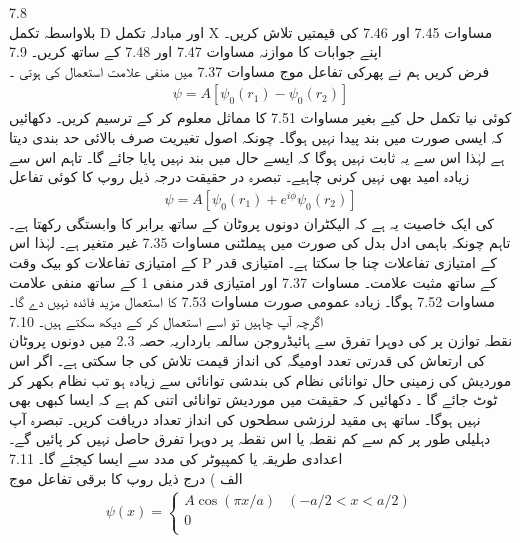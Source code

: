  
7.8\\
بلاواسطہ تکمل D اور مبادلہ تکمل X مساوات 7.45 اور 7.46 کی قیمتیں تلاش کریں۔ اپنے جوابات کا موازنہ مساوات 7.47 اور 7.48 کے ساتھ کریں۔ 
7.9\\
فرض کریں ہم نے پھرکی تفاعل موج مساوات 7.37 میں منفی علامت استعمال کی ہوتی ۔
\begin{align}
\psi=A[\psi_{0}(r_{1})-\psi_{0}(r_{2})]
\end{align}
 کوئی نیا تکمل حل کیے بغیر مساوات 7.51 کا مماثل  معلوم کر کے ترسیم کریں۔ دکھائیں کہ ایسی صورت میں بند پیدا نہیں ہوگا۔ چونکہ اصول تغیریت صرف بالائی حد بندی دیتا ہے لہٰذا اس سے یہ ثابت نہیں ہوگا کہ ایسے حال میں بند نہیں پایا جائے گا۔ تاہم اس سے زیادہ امید بھی نہیں کرنی چاہیے۔ تبصرہ در حقیقت درجہ ذیل روپ کا کوئی تفاعل 
\begin{align}
\psi=A[\psi_{0}(r_{1})+e^{i\phi}\psi_{0}(r_{2})]
\end{align}
 کی ایک خاصیت یہ ہے کہ الیکٹران دونوں پروٹان کے ساتھ برابر کا وابستگی رکھتا ہے۔ تاہم چونکہ باہمی ادل بدل   کی صورت میں ہیملٹنی مساوات 7.35 غیر متغیر ہے۔ لہٰذا اس کے امتیازی تفاعلات کو بیک وقت P کے امتیازی تفاعلات چنا جا سکتا ہے۔ امتیازی قدر  کے ساتھ مثبت علامت۔ مساوات 7.37 اور امتیازی قدر منفی 1 کے ساتھ منفی علامت مساوات 7.52 ہوگا۔ زیادہ عمومی صورت مساوات 7.53 کا استعمال مزید فائدہ نہیں دے گا۔ اگرچہ آپ چاہیں تو اسے استعمال کر کے دیکھ سکتے ہیں۔
7.10\\
نقطہ توازن پر   کی دوہرا تفرق سے ہائیڈروجن سالمہ بارداریہ حصہ 2.3 میں دونوں پروٹان کی ارتعاش کی قدرتی تعدد اومیگہ کی انداز قیمت تلاش کی جا سکتی ہے۔ اگر اس موردیش کی زمینی حال توانائی     نظام کی بندشی توانائی سے زیادہ ہو تب نظام بکھر کر ٹوٹ جائے گا ۔ دکھائیں کہ حقیقت میں موردیش توانائی اتنی کم ہے کہ ایسا کبھی بھی نہیں ہوگا۔ ساتھ ہی مقید لرزشی سطحوں کی انداز تعداد دریافت کریں۔ تبصرہ 
آپ دہلیلی طور پر کم سے کم نقطہ یا اس نقطہ پر دوہرا تفرق حاصل نہیں کر پائیں گے۔ اعدادی طریقہ یا کمپیوٹر کی مدد سے ایسا کیجئے گا۔
7.11\\
الف ) درج ذیل روپ کا برقی تفاعل موج
\begin{align}
\psi(x)=\begin{cases} A\cos{(\pi x/a)} & (-a/2<x<a/2)\\
0\\
\end{cases} 
\end{align}

